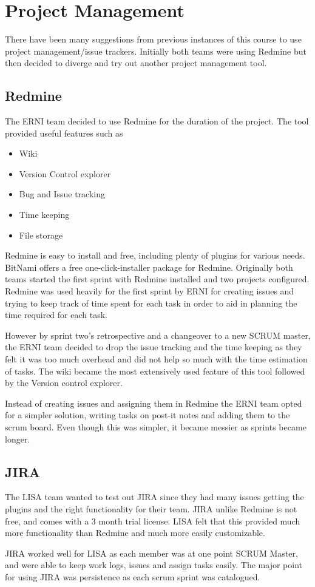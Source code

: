 \section{Project Management}

There have been many suggestions from previous instances of this course to use project management/issue trackers. Initially both teams were using Redmine but then decided to diverge and try out another project management tool. 

\subsection{Redmine}

The ERNI team decided to use Redmine for the duration of the project. The tool provided useful features such as
\begin{itemize}
\item Wiki
\item Version Control explorer
\item Bug and Issue tracking
\item Time keeping
\item File storage
\end{itemize} 

Redmine is easy to install and free, including plenty of plugins for various needs. BitNami offers a free one-click-installer package for Redmine. Originally both teams started the first sprint with Redmine installed and two projects configured. Redmine was used heavily for the first sprint by ERNI for creating issues and trying to keep track of time spent for each task in order to aid in planning the time required for each task. 

However by sprint two's retrospective and a changeover to a new SCRUM master, the ERNI team decided to drop the issue tracking and the time keeping as they felt it was too much overhead and did not help so much with the time estimation of tasks. The wiki became the most extensively used feature of this tool followed by the Version control explorer. 

Instead of creating issues and assigning them in Redmine the ERNI team opted for a simpler solution, writing tasks on post-it notes and adding them to the scrum board. Even though this was simpler, it became messier as sprints became longer.

\subsection{JIRA}

The LISA team wanted to test out JIRA since they had many issues getting the plugins and the right functionality for their team. JIRA unlike Redmine is not free, and comes with a 3 month trial license. LISA felt that this provided much more functionality than Redmine and much more easily customizable.

JIRA worked well for LISA as each member was at one point SCRUM Master, and were able to keep work logs, issues and assign tasks easily. The major point for using JIRA was persistence as each scrum sprint was catalogued.
